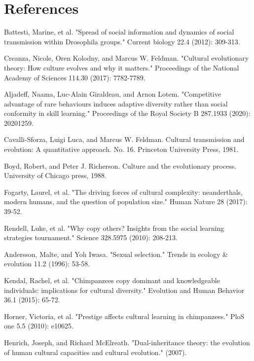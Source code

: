 \documentclass[12pt]{extarticle}
\begin{document}
\section*{References}
\nolinenumbers
\begin{thebibliography}{}


  Battesti, Marine, et al. "Spread of social information and dynamics of social transmission within Drosophila groups." Current biology 22.4 (2012): 309-313.

Creanza, Nicole, Oren Kolodny, and Marcus W. Feldman. "Cultural evolutionary theory: How culture evolves and why it matters." Proceedings of the National Academy of Sciences 114.30 (2017): 7782-7789.

Aljadeff, Naama, Luc-Alain Giraldeau, and Arnon Lotem. "Competitive advantage of rare behaviours induces adaptive diversity rather than social conformity in skill learning." Proceedings of the Royal Society B 287.1933 (2020): 20201259.

Cavalli-Sforza, Luigi Luca, and Marcus W. Feldman. Cultural transmission and evolution: A quantitative approach. No. 16. Princeton University Press, 1981.

Boyd, Robert, and Peter J. Richerson. Culture and the evolutionary process. University of Chicago press, 1988.

Fogarty, Laurel, et al. "The driving forces of cultural complexity: neanderthals, modern humans, and the question of population size." Human Nature 28 (2017): 39-52.

Rendell, Luke, et al. "Why copy others? Insights from the social learning strategies tournament." Science 328.5975 (2010): 208-213.

Andersson, Malte, and Yoh Iwasa. "Sexual selection." Trends in ecology \& evolution 11.2 (1996): 53-58.

Kendal, Rachel, et al. "Chimpanzees copy dominant and knowledgeable individuals: implications for cultural diversity." Evolution and Human Behavior 36.1 (2015): 65-72.

Horner, Victoria, et al. "Prestige affects cultural learning in chimpanzees." PloS one 5.5 (2010): e10625.

Henrich, Joseph, and Richard McElreath. "Dual-inheritance theory: the evolution of human cultural capacities and cultural evolution." (2007).


\end{thebibliography}
\end{document}
